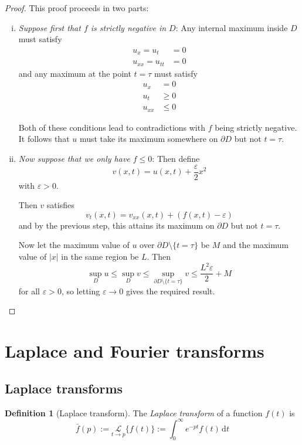 \documentclass[10pt,fleqn]{article}
\newcommand{\diff}{\,\mathrm{d}}
\newcommand{\eps}{\varepsilon}
\theoremstyle{definition} \newtheorem{defn}{Definition}[section]
\theoremstyle{plain}      \newtheorem{thm}[defn]{Theorem}
\theoremstyle{plain}      \newtheorem{lem}[defn]{Lemma}
\theoremstyle{definition} \newtheorem{prop}[defn]{Proposition}
\theoremstyle{definition} \newtheorem{cor}[defn]{Corollary}
\theoremstyle{definition} \newtheorem{ex}[defn]{Example}
\theoremstyle{definition} \newtheorem{rem}[defn]{Remark}
\begin{document}
{\begin{proof}
    This proof proceeds in two parts:
    \begin{enumerate}[(i)]
        \item \emph{Suppose first that $f$ is strictly negative in $D$}:
        Any internal maximum inside $D$ must satisfy
        \begin{align*}
            u_x=u_t&=0\\
            u_{xx}=u_{tt}&=0
        \end{align*}
        and any maximum at the point $t=\tau$ must satisfy
        \begin{align*}
            u_x&=0\\
            u_t&\geq0\\
            u_{xx}&\leq0
        \end{align*}

        Both of these conditions lead to contradictions with $f$ being strictly negative.
        It follows that $u$ must take its maximum somewhere on $\partial D$ but not $t=\tau$.
        \item \emph{Now suppose that we only have $f\leq0$}:
        Then define
        \[
            v(x,t)=
            u(x,t)+\frac{\eps}{2}x^2
        \]
        with $\eps>0$.

        Then $v$ satisfies
        \[
            v_t(x,t)=
            v_{xx}(x,t)+(f(x,t)-\eps)
        \]
        and by the previous step, this attains its maximum on $\partial D$ but not $t=\tau$.

        Now let the maximum value of $u$ over $\partial D\setminus\{t=\tau\}$ be $M$ and the maximum value of $|x|$ in the same region be $L$.
        Then
        \[
            \sup_{D} u\leq \sup_{D}v\leq\sup_{\partial D\setminus\{t=\tau\}}v\leq\frac{L^2\eps}{2}+M
        \]
        for all $\eps>0$, so letting $\eps\to0$ gives the required result.
    \end{enumerate}
\end{proof}


\section{Laplace and Fourier transforms}

\subsection{Laplace transforms}

\begin{defn}[Laplace transform]
    The \emph{Laplace transform} of a function $f(t)$ is
    \begin{equation}
        \bar{f}(p):=
        \underset{t\to p}{\mathcal{L}}\{f(t)\}:=
        \int_0^{\infty}e^{-pt}f(t)\diff t
    \end{equation}
\end{defn}

}
\end{document}
